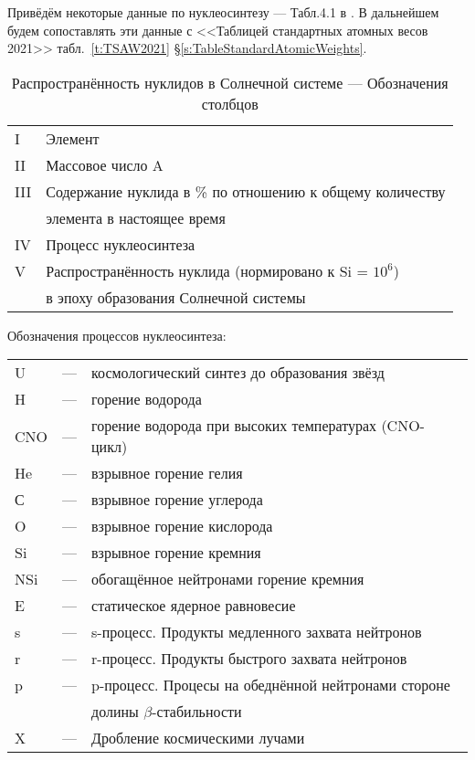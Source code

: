 \documentclass[a5paper,openany]{book}
\begin{document}
Привёдём некоторые данные по нуклеосинтезу --- Табл.4.1 в \cite{Nucleosynthesis}. 
В дальнейшем будем сопоставлять эти данные с <<Таблицей стандартных атомных весов 2021>>
табл.~\ref{t:TSAW2021} \S\ref{s:TableStandardAtomicWeights}.

\begin{table}[h!]
	{\small 
		\begin{tabular}{ll}
			I & Элемент \\
			II & Массовое число A \\	
			III & Содержание нуклида в \% по отношению к общему количеству \\
					 & элемента в настоящее время \\
			IV & Процесс нуклеосинтеза  \\
			V & Распространённость нуклида (нормировано к Si = $10^6$)  \\
		& в эпоху образования Солнечной системы		
	\end{tabular}
	}
	\caption{Распространённость нуклидов в Солнечной системе --- Обозначения столбцов}
	\label{t:AbudancesSolarNotes}
\end{table}

Обозначения  процессов нуклеосинтеза:\\
	{\small 
\begin{tabular}{lcl}
U & --- & космологический синтез до образования звёзд \\
H & --- & горение водорода \\
CNO & --- & горение водорода при высоких температурах (CNO-цикл) \\
He & --- & взрывное горение гелия \\	
С & --- & взрывное горение углерода \\
O & --- & взрывное горение кислорода \\
Si & --- & взрывное горение кремния \\
NSi & --- & обогащённое нейтронами горение кремния \\
E & --- & статическое ядерное равновесие \\
s & --- & s-процесс. Продукты медленного захвата нейтронов\\
r & --- & r-процесс. Продукты быстрого захвата нейтронов\\
p & --- & p-процесс. Процесы на обеднённой нейтронами стороне \\
 & & долины $\beta$-стабильности\\
X & --- & Дробление космическими лучами \\
\end{tabular}
}
\end{document}
